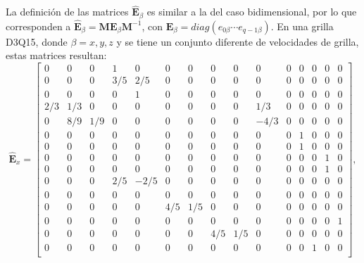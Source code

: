 La definici\'on de las matrices $\hat{\bm{E}}_{\beta}$ es similar a la del caso bidimensional, por lo que corresponden a $\hat{\bm{E}}_{\beta} = \bm{M} \bm{E}_{\beta} \bm{M}^{-1}$, con $\bm{E}_{\beta} = diag(e_{0\beta} \cdots e_{q-1\beta})$. En una grilla D3Q15, donde $\beta=x,y,z$ y se tiene un conjunto diferente de velocidades de grilla, estas matrices resultan:
\setcounter{MaxMatrixCols}{15}
\begin{equation}
	\hat{\bm{E}}_{x}=
	\begin{bmatrix}
	0 & 0 & 0 & 1 & 0 & 0 & 0 & 0 & 0 & 0 & 0 & 0 & 0 & 0 & 0 \\
	0 & 0 & 0 & 3/5 & 2/5 & 0 & 0 & 0 & 0 & 0 & 0 & 0 & 0 & 0 & 0 \\
	0 & 0 & 0 & 0 & 1 & 0 & 0 & 0 & 0 & 0 & 0 & 0 & 0 & 0 & 0 \\
	2/3 & 1/3 & 0 & 0 & 0 & 0 & 0 & 0 & 0 & 1/3 & 0 & 0 & 0 & 0 & 0 \\
	0 & 8/9 & 1/9 & 0 & 0 & 0 & 0 & 0 & 0 & -4/3 & 0 & 0 & 0 & 0 & 0 \\
	0 & 0 & 0 & 0 & 0 & 0 & 0 & 0 & 0 & 0 & 0 & 1 & 0 & 0 & 0 \\
	0 & 0 & 0 & 0 & 0 & 0 & 0 & 0 & 0 & 0 & 0 & 1 & 0 & 0 & 0 \\
	0 & 0 & 0 & 0 & 0 & 0 & 0 & 0 & 0 & 0 & 0 & 0 & 0 & 1 & 0 \\
	0 & 0 & 0 & 0 & 0 & 0 & 0 & 0 & 0 & 0 & 0 & 0 & 0 & 1 & 0 \\
	0 & 0 & 0 & 2/5 & -2/5 & 0 & 0 & 0 & 0 & 0 & 0 & 0 & 0 & 0 & 0 \\
	0 & 0 & 0 & 0 & 0 & 0 & 0 & 0 & 0 & 0 & 0 & 0 & 0 & 0 & 0 \\
	0 & 0 & 0 & 0 & 0 & 4/5 & 1/5 & 0 & 0 & 0 & 0 & 0 & 0 & 0 & 0 \\
	0 & 0 & 0 & 0 & 0 & 0 & 0 & 0 & 0 & 0 & 0 & 0 & 0 & 0 & 1 \\
	0 & 0 & 0 & 0 & 0 & 0 & 0 & 4/5 & 1/5 & 0 & 0 & 0 & 0 & 0 & 0 \\
	0 & 0 & 0 & 0 & 0 & 0 & 0 & 0 & 0 & 0 & 0 & 0 & 1 & 0 & 0 \\
	\end{bmatrix},
\end{equation} 

